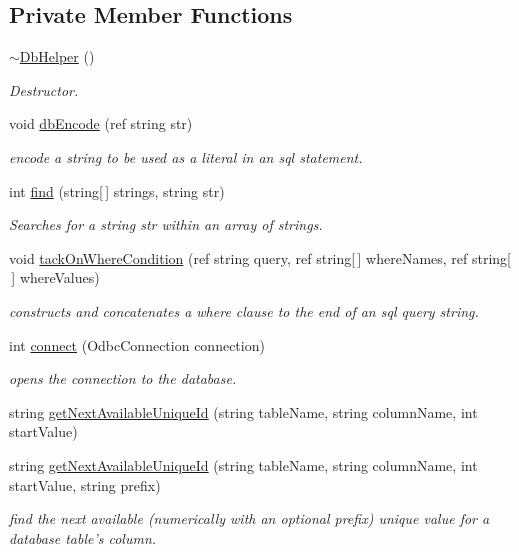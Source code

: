 \subsection*{Private Member Functions}
\begin{DoxyCompactItemize}
\item 
\hyperlink{class_ias_pbx_config_1_1_db_helper_a0bf0a2cea3701b5ab736c9da279c6ec3}{$\sim$DbHelper} ()
\begin{DoxyCompactList}\small\item\em Destructor. \item\end{DoxyCompactList}\item 
void \hyperlink{class_ias_pbx_config_1_1_db_helper_aad194ee869204b99082e7779888addd1}{dbEncode} (ref string str)
\begin{DoxyCompactList}\small\item\em encode a string to be used as a literal in an sql statement. \item\end{DoxyCompactList}\item 
int \hyperlink{class_ias_pbx_config_1_1_db_helper_a92c16852946e46462fe8bb9923ce374c}{find} (string\mbox{[}$\,$\mbox{]} strings, string str)
\begin{DoxyCompactList}\small\item\em Searches for a string str within an array of strings. \item\end{DoxyCompactList}\item 
void \hyperlink{class_ias_pbx_config_1_1_db_helper_a0b6833e58769ca9396160a5cf189adfc}{tackOnWhereCondition} (ref string query, ref string\mbox{[}$\,$\mbox{]} whereNames, ref string\mbox{[}$\,$\mbox{]} whereValues)
\begin{DoxyCompactList}\small\item\em constructs and concatenates a where clause to the end of an sql query string. \item\end{DoxyCompactList}\item 
int \hyperlink{class_ias_pbx_config_1_1_db_helper_a447599403ee4d744b04b98b1642a80ed}{connect} (OdbcConnection connection)
\begin{DoxyCompactList}\small\item\em opens the connection to the database. \item\end{DoxyCompactList}\item 
string \hyperlink{class_ias_pbx_config_1_1_db_helper_a2bd877f0a61b7989f6da77d7f637ecb8}{getNextAvailableUniqueId} (string tableName, string columnName, int startValue)
\item 
string \hyperlink{class_ias_pbx_config_1_1_db_helper_ae67ee3d912d67babce90e7ef22d1ef75}{getNextAvailableUniqueId} (string tableName, string columnName, int startValue, string prefix)
\begin{DoxyCompactList}\small\item\em find the next available (numerically with an optional prefix) unique value for a database table's column. \item\end{DoxyCompactList}\end{DoxyCompactItemize}
